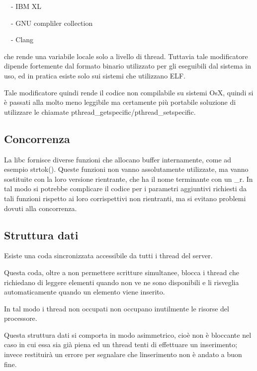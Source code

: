 \documentclass[a4paper,11pt]{article}
\begin{document}
{\sffamily
\ \ {}- IBM XL\cite{COMP02}}

{\sffamily
\ \ {}- GNU compliler collection\cite{COMP03}}

{\sffamily
\ \ {}- Clang\cite{COMP04}}

{\sffamily
che rende una variabile locale solo a livello di thread. Tuttavia tale
modificatore dipende fortemente dal formato binario utilizzato per gli
eseguibili dal sistema in uso, ed in pratica esiste solo sui sistemi
che utilizzano ELF\cite{COMP05}.}

{\sffamily
Tale modificatore quindi rende il codice non compilabile su sistemi
OsX\cite{COMP06}, quindi si \`e passati alla molto meno leggibile ma
certamente pi\`u portabile soluzione di utilizzare le chiamate
pthread\_getspecific/pthread\_setspecific\cite{LIBC05}.}


\bigskip

\subsection{Concorrenza}
{\sffamily
La libc fornisce diverse funzioni che allocano buffer internamente, come
ad esempio strtok(). Queste funzioni non vanno assolutamente
utilizzate, ma vanno sostituite con la loro versione rientrante, che ha
il nome terminante con un {\textquotedbl}\_r{\textquotedbl}\cite{LIBC06}. In
tal modo si potrebbe complicare il codice per i parametri aggiuntivi
richiesti da tali funzioni rispetto ai loro corrispettivi non
rientranti, ma si evitano problemi dovuti alla concorrenza.}


\bigskip

\subsection{Struttura dati}
{\sffamily
Esiste una coda sincronizzata accessibile da tutti i thread del server.}

{\sffamily
Questa coda, oltre a non permettere scritture simultanee, blocca i
thread che richiedano di leggere elementi quando non ve ne sono
disponibili e li risveglia automaticamente quando un elemento viene
inserito.}

{\sffamily
In tal modo i thread non occupati non occupano inutilmente le risorse
del processore.}


\bigskip

{\sffamily
Questa struttura dati si comporta in modo asimmetrico, cio\`e non \`e
bloccante nel caso in cui essa sia gi\`a piena ed un thread tenti di
effettuare un inserimento; invece restituir\`a un errore per segnalare
che l{\textquotesingle}inserimento non \`e andato a buon fine.}
\end{document}
